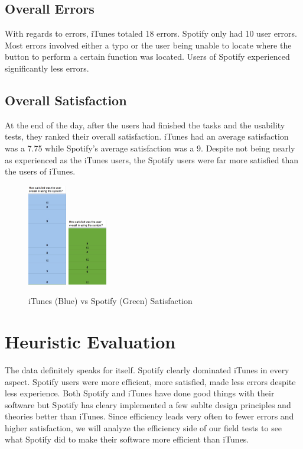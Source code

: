 \documentclass[a4paper]{article}
\begin{document}
\subsection{Overall Errors}
With regards to errors, iTunes totaled 18 errors. Spotify only had 10 user errors. Most errors involved either a typo or the user being unable to locate where the button to perform a certain function was located. Users of Spotify experienced significantly less errors.

\subsection{Overall Satisfaction}
  At the end of the day, after the users had finished the tasks and the usability tests, they ranked their overall satisfaction. iTunes had an average satisfaction was a 7.75 while Spotify's average satisfaction was a 9. Despite not being nearly as experienced as the iTunes users, the Spotify users were far more satisfied than the users of iTunes.
\begin{figure}[H]
\centering
\includegraphics[width=0.15\textwidth]{itunes_satis.jpg}
\includegraphics[width=0.15\textwidth]{spotifysatis__copy.jpg}
\caption{\label{overall: satisfactionSpotify} iTunes (Blue) vs Spotify (Green) Satisfaction}
\end{figure}


\section{Heuristic Evaluation}
\label{sec:heuristicEval}
The data definitely speaks for itself. Spotify clearly dominated iTunes in every aspect. Spotify users were more efficient, more satisfied, made less errors despite less experience. Both Spotify and iTunes have done good things with their software but Spotify has cleary implemented a few sublte design principles and theories better than iTunes. Since efficiency leads very often to fewer errors and higher satisfaction, we will analyze the efficiency side of our field tests to see what Spotify did to make their software more efficient than iTunes.
\end{document}
